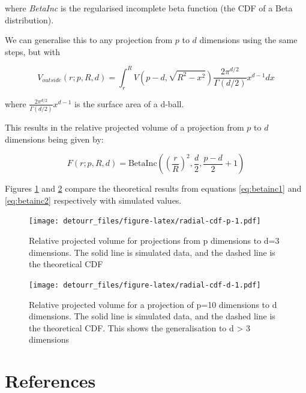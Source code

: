 where \emph{BetaInc} is the regularised incomplete beta function (the CDF of a Beta distribution).

We can generalise this to any projection from \(p\) to \(d\) dimensions using the same steps, but with

\begin{equation}
  V_{outside}(r; p, R, d) = \int_r^R V(p-d, \sqrt{R^2 - x^2}) 
  \frac{2\pi^{d/2}}{\Gamma(d/2)} x^{d-1} dx
\end{equation}

where \(\frac{2\pi^{d/2}}{\Gamma(d/2)} x^{d-1}\) is the surface area of a d-ball.

This results in the relative projected volume of a projection from \(p\) to \(d\) dimensions being given by:

\begin{equation}
F(r; p, R, d) = \mathrm{BetaInc}\left(\left(\frac{r}{R}\right)^2, \frac{d}{2}, \frac{p-d}{2}+1\right)
\label{eq:betainc2}
\end{equation}

Figures \ref{fig:radial-cdf-p} and \ref{fig:radial-cdf-d} compare the theoretical results from equations \eqref{eq:betainc1} and \eqref{eq:betainc2} respectively with simulated values.

\begin{figure}
\centering
\texttt{[image: detourr\_files/figure-latex/radial-cdf-p-1.pdf]}
\caption{\label{fig:radial-cdf-p}Relative projected volume for projections from p dimensions to d=3 dimensions. The solid line is simulated data, and the dashed line is the theoretical CDF}
\end{figure}

\begin{figure}
\centering
\texttt{[image: detourr\_files/figure-latex/radial-cdf-d-1.pdf]}
\caption{\label{fig:radial-cdf-d}Relative projected volume for a projection of p=10 dimensions to d dimensions. The solid line is simulated data, and the dashed line is the theoretical CDF. This shows the generalisation to d \textgreater{} 3 dimensions}
\end{figure}

\hypertarget{references}{%
\section*{References}\label{references}}


